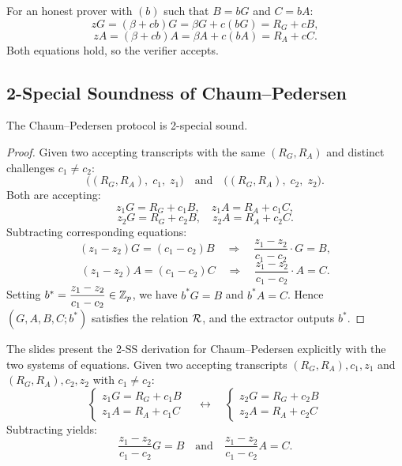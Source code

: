 \documentclass[11pt]{article}
\begin{document}
For an honest prover with $(b)$ such that $B = bG$ and $C = bA$:
\[
  zG = (\beta + cb)G = \beta G + c(bG) = R_G + cB,
\]
\[
  zA = (\beta + cb)A = \beta A + c(bA) = R_A + cC.
\]
Both equations hold, so the verifier accepts.

\subsection{2-Special Soundness of Chaum--Pedersen}

\begin{theorem}
The Chaum--Pedersen protocol is 2-special sound.
\end{theorem}

\begin{proof}
Given two accepting transcripts with the same $(R_G, R_A)$ and distinct challenges $c_1 \neq c_2$:
\[
  \bigl((R_G, R_A),\; c_1,\; z_1\bigr) \quad \text{and} \quad \bigl((R_G, R_A),\; c_2,\; z_2\bigr).
\]
Both are accepting:
\[
  z_1 G = R_G + c_1 B, \quad z_1 A = R_A + c_1 C,
\]
\[
  z_2 G = R_G + c_2 B, \quad z_2 A = R_A + c_2 C.
\]
Subtracting corresponding equations:
\[
  (z_1 - z_2)G = (c_1 - c_2)B \quad \Longrightarrow \quad \frac{z_1 - z_2}{c_1 - c_2}\cdot G = B,
\]
\[
  (z_1 - z_2)A = (c_1 - c_2)C \quad \Longrightarrow \quad \frac{z_1 - z_2}{c_1 - c_2}\cdot A = C.
\]
Setting $b^* = \dfrac{z_1 - z_2}{c_1 - c_2} \in \mathbb{Z}_p$, we have $b^*G = B$ and $b^*A = C$. Hence $(G, A, B, C; b^*)$ satisfies the relation $\mathcal{R}$, and the extractor outputs $b^*$.
\end{proof}

\begin{remark}
The slides present the 2-SS derivation for Chaum--Pedersen explicitly with the two systems of equations. Given two accepting transcripts $(R_G, R_A), c_1, z_1$ and $(R_G, R_A), c_2, z_2$ with $c_1 \neq c_2$:
\[
  \begin{cases}
    z_1 G = R_G + c_1 B\\
    z_1 A = R_A + c_1 C
  \end{cases}
  \quad\longleftrightarrow\quad
  \begin{cases}
    z_2 G = R_G + c_2 B\\
    z_2 A = R_A + c_2 C
  \end{cases}
\]
Subtracting yields:
\[
  \frac{z_1 - z_2}{c_1 - c_2} G = B \quad \text{and} \quad \frac{z_1 - z_2}{c_1 - c_2} A = C.
\]
\end{remark}

\end{document}
